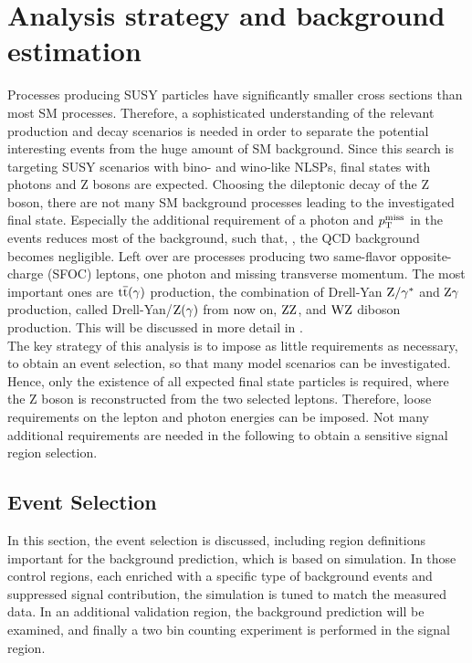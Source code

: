 \chapter{Analysis strategy and background estimation}\label{chap:analysis}
\minitoc
Processes producing SUSY particles have significantly smaller cross sections than most SM processes. Therefore, a sophisticated understanding of the relevant production and decay scenarios is needed in order to separate the potential interesting events from the huge amount of SM background. Since this search is targeting SUSY scenarios with bino- and wino-like NLSPs, final states with photons and Z bosons are expected. Choosing the dileptonic decay of the Z boson, there are not many SM background processes leading to the investigated final state. Especially the additional requirement of a photon and $p_{\mathrm{T}}^\text{miss}$ in the events reduces most of the background, such that, \eg, the QCD background becomes negligible. Left over are processes producing two same-flavor opposite-charge (SFOC) leptons, one photon and missing transverse momentum. The most important ones are ${\mathrm{t}\overline{\mathrm{t}}}(\gamma)$ production, the combination of Drell-Yan $\mathrm{Z}/\gamma^{*}$ and $\mathrm{Z}\gamma$ production, called Drell-Yan/$\mathrm{Z}(\gamma)$ from now on, $\mathrm{Z}\mathrm{Z}$, and $\mathrm{W}\mathrm{Z}$ diboson production. This will be discussed in more detail in .\\
The key strategy of this analysis is to impose as little requirements as necessary, to obtain an event selection, so that many model scenarios can be investigated. Hence, only the existence of all expected final state particles is required, where the Z boson is reconstructed from the two selected leptons. Therefore, loose requirements on the lepton and photon energies can be imposed. Not many additional requirements are needed in the following to obtain a sensitive signal region selection.

\section{Event Selection}
In this section, the event selection is discussed, including region definitions important for the background prediction, which is based on simulation. In those control regions, each enriched with a specific type of background events and suppressed signal contribution, the simulation is tuned to match the measured data. In an additional validation region, the background prediction will be examined, and finally a two bin counting experiment is performed in the signal region.
